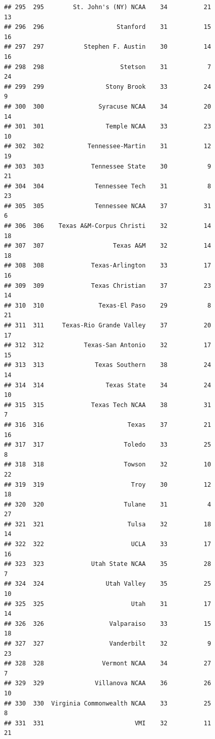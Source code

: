 \documentclass[]{book}
\begin{document}
\begin{verbatim}
## 295  295        St. John's (NY) NCAA    34          21            13
## 296  296                    Stanford    31          15            16
## 297  297           Stephen F. Austin    30          14            16
## 298  298                     Stetson    31           7            24
## 299  299                 Stony Brook    33          24             9
## 300  300               Syracuse NCAA    34          20            14
## 301  301                 Temple NCAA    33          23            10
## 302  302            Tennessee-Martin    31          12            19
## 303  303             Tennessee State    30           9            21
## 304  304              Tennessee Tech    31           8            23
## 305  305              Tennessee NCAA    37          31             6
## 306  306    Texas A&M-Corpus Christi    32          14            18
## 307  307                   Texas A&M    32          14            18
## 308  308             Texas-Arlington    33          17            16
## 309  309             Texas Christian    37          23            14
## 310  310               Texas-El Paso    29           8            21
## 311  311     Texas-Rio Grande Valley    37          20            17
## 312  312           Texas-San Antonio    32          17            15
## 313  313              Texas Southern    38          24            14
## 314  314                 Texas State    34          24            10
## 315  315             Texas Tech NCAA    38          31             7
## 316  316                       Texas    37          21            16
## 317  317                      Toledo    33          25             8
## 318  318                      Towson    32          10            22
## 319  319                        Troy    30          12            18
## 320  320                      Tulane    31           4            27
## 321  321                       Tulsa    32          18            14
## 322  322                        UCLA    33          17            16
## 323  323             Utah State NCAA    35          28             7
## 324  324                 Utah Valley    35          25            10
## 325  325                        Utah    31          17            14
## 326  326                  Valparaiso    33          15            18
## 327  327                  Vanderbilt    32           9            23
## 328  328                Vermont NCAA    34          27             7
## 329  329              Villanova NCAA    36          26            10
## 330  330  Virginia Commonwealth NCAA    33          25             8
## 331  331                         VMI    32          11            21

\end{verbatim}
\end{document}
